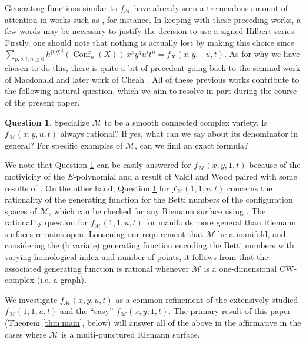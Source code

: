\documentclass[11pt,reqno]{amsproc}
\numberwithin{equation}{section}
\theoremstyle{definition}
\newtheorem{question}[theorem]{Question}
\theoremstyle{remark}
\DeclareMathOperator{\Conf}{Conf}
\begin{document}
Generating functions similar to $f_\mathcal{M}$ have already seen a tremendous amount of attention in works such as \cite{cheonghuang2022betti,drummondcoleknudsen,vakilwood2015discriminants}, for instance. In keeping with these preceding works, a few words may be necessary to justify the decision to use a signed Hilbert series. Firstly, one should note that nothing is actually lost by making this choice since $\sum_{p,q,i,n\geq 0} h^{p,q;i}(\Conf_n(X))\, x^p y^q u^i t^n = f_X(x,y,-u,t)$. As for why we have chosen to do this, there is quite a bit of precedent going back to the seminal work of Macdonald \cite{macdonald1962poincare} and later work of Cheah \cite{Ch}. All of these previous works contribute to the following natural question, which we aim to resolve in part during the course of the present paper.

\begin{question}\label{mainQuestion}
Specialize $\mathcal{M}$ to be a smooth connected complex variety. Is $f_\mathcal{M}(x,y,u,t)$ always rational? If yes, what can we say about its denominator in general? For specific examples of $\mathcal{M}$, can we find an exact formula?
\end{question}

We note that Question \ref{mainQuestion} can be easily answered for $f_\mathcal{M}(x,y,1,t)$ because of the motivicity of the $E$-polynomial and a result of Vakil and Wood \cite[Proposition 5.9]{vakilwood2015discriminants} paired with some results of \cite{macdonald1962poincare}. On the other hand, Question \ref{mainQuestion} for $f_\mathcal{M}(1,1,u,t)$ concerns the rationality of the generating function for the Betti numbers of the configuration spaces of $\mathcal{M}$, which can be checked for any Riemann surface using \cite{drummondcoleknudsen}. The rationality question for $f_\mathcal{M}(1,1,u,t)$ for manifolds more general than Riemann surfaces remains open. Loosening our requirement that $\mathcal{M}$ be a manifold, and considering the (bivariate) generating function encoding the Betti numbers with varying homological index and number of points, it follows from \cite{ramos2018stability,an2019subdivisional} that the associated generating function is rational whenever $\mathcal{M}$ is a one-dimensional CW-complex (i.e. a graph).


We investigate $f_\mathcal{M}(x,y,u,t)$ as a common refinement of the extensively studied $f_\mathcal{M}(1,1,u,t)$ and the ``easy'' $f_\mathcal{M}(x,y,1,t)$. The primary result of this paper (Theorem \ref{thm:main}, below) will answer all of the above in the affirmative in the cases where $\mathcal{M}$ is a multi-punctured Riemann surface.
\end{document}
